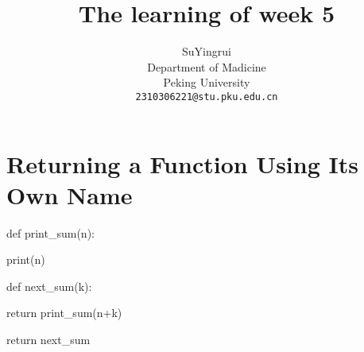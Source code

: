 \documentclass{article}
\title{The learning of week 5}
\author{%
  SuYingrui \\
  Department of Madicine\\
  Peking University\\
  \texttt{2310306221@stu.pku.edu.cn} \\
}
\begin{document}
\maketitle

\section{Returning a Function Using Its Own Name}
def print\_sum(n):

print(n)
  
  def next\_sum(k):
      
      return print\_sum(n+k)
    
  return next\_sum
\end{document}
